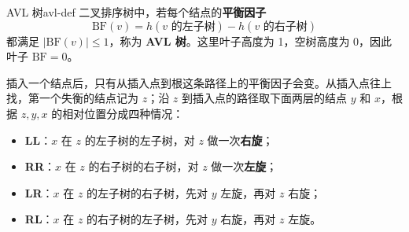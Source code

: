 \begin{mydef}{AVL 树}{avl-def}
二叉排序树中，若每个结点的\textbf{平衡因子}
\[
\mathrm{BF}(v)=h(v\text{ 的左子树})-h(v\text{ 的右子树})
\]
都满足 $|\mathrm{BF}(v)|\leqslant1$，称为 \textbf{AVL 树}。这里叶子高度为 1，空树高度为 0，因此叶子 $\mathrm{BF}=0$。
\end{mydef}

插入一个结点后，只有从插入点到根这条路径上的平衡因子会变。从插入点往上找，第一个失衡的结点记为 $z$；沿 $z$ 到插入点的路径取下面两层的结点 $y$ 和 $x$，根据 $z,y,x$ 的相对位置分成四种情况：

\begin{itemize}
  \item \textbf{LL}：$x$ 在 $z$ 的左子树的左子树，对 $z$ 做一次\textbf{右旋}；
  \item \textbf{RR}：$x$ 在 $z$ 的右子树的右子树，对 $z$ 做一次\textbf{左旋}；
  \item \textbf{LR}：$x$ 在 $z$ 的左子树的右子树，先对 $y$ 左旋，再对 $z$ 右旋；
  \item \textbf{RL}：$x$ 在 $z$ 的右子树的左子树，先对 $y$ 右旋，再对 $z$ 左旋。
\end{itemize}

